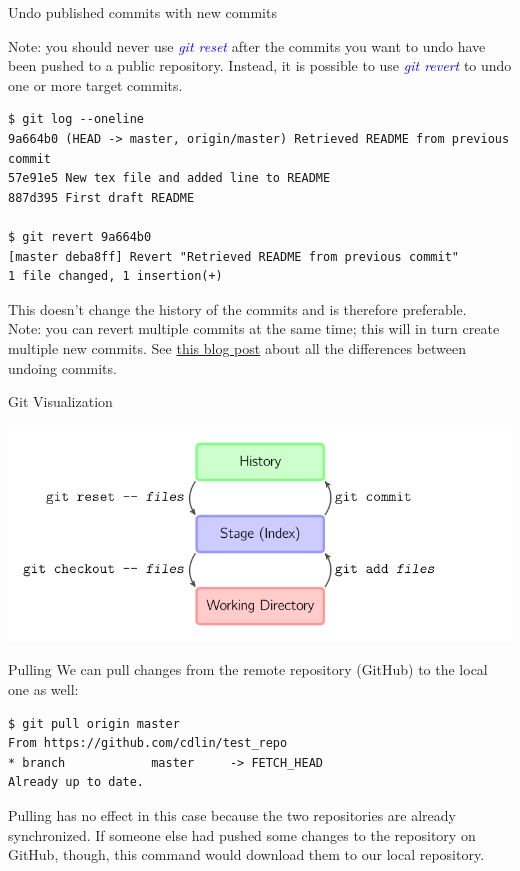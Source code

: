 \documentclass[11pt]{beamer}
\begin{document}
\begin{frame}[fragile]{Undo published commits with new commits}

Note: you should never use \textcolor{blue}{\emph{git reset}} after the commits you want to undo have been pushed to a public repository. Instead, it is possible to use \textcolor{blue}{\emph{git revert}} to undo one or more target commits.

\begin{lstlisting}
$ git log --oneline
9a664b0 (HEAD -> master, origin/master) Retrieved README from previous commit
57e91e5 New tex file and added line to README
887d395 First draft README

$ git revert 9a664b0
[master deba8ff] Revert "Retrieved README from previous commit"
1 file changed, 1 insertion(+)
\end{lstlisting}

This doesn't change the history of the commits and is therefore preferable.\\
\medskip
Note: you can revert multiple commits at the same time; this will in turn create multiple new commits.
See \href{https://github.com/blog/2019-how-to-undo-almost-anything-with-git}{this blog post} about all the differences between undoing commits.
\end{frame}
\begin{frame}{Git Visualization}
\begin{center}
	\includegraphics[width=1.0\textwidth]{./auxfiles/basic-usage.png}
\end{center}
\end{frame}



\begin{frame}[fragile]{Pulling}
We can pull changes from the remote repository (GitHub) to the local one as well:

\begin{lstlisting}
$ git pull origin master
From https://github.com/cdlin/test_repo
* branch            master     -> FETCH_HEAD
Already up to date.
\end{lstlisting}

Pulling has no effect in this case because the two repositories are already synchronized. If someone else had pushed some changes to the repository on GitHub, though, this command would download them to our local repository.\\

\end{frame}
\end{document}
